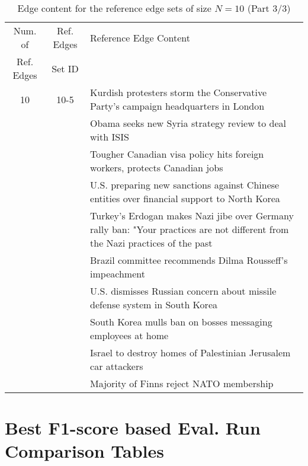 \begin{table}[H]
\begin{tabular}{cc p{10cm}}
\toprule
\multicolumn{1}{c}{Num. of}			& \multicolumn{1}{c}{Ref. Edges}		& \multicolumn{1}{l}{Reference Edge Content} \\
\multicolumn{1}{c}{Ref. Edges}		& \multicolumn{1}{c}{Set ID}			& \multicolumn{1}{c}{} \\
\midrule
10 & 10-5 & Kurdish protesters storm the Conservative Party's campaign headquarters in London \\
 &  & Obama seeks new Syria strategy review to deal with ISIS \\
 &  & Tougher Canadian visa policy hits foreign workers, protects Canadian jobs \\
 &  & U.S. preparing new sanctions against Chinese entities over financial support to North Korea \\
 &  & Turkey's Erdogan makes Nazi jibe over Germany rally ban: "Your practices are not different from the Nazi practices of the past \\
 &  & Brazil committee recommends Dilma Rousseff's impeachment \\
 &  & U.S. dismisses Russian concern about missile defense system in South Korea \\
 &  & South Korea mulls ban on bosses messaging employees at home \\
 &  & Israel to destroy homes of Palestinian Jerusalem car attackers \\
 &  & Majority of Finns reject NATO membership \\
\bottomrule
\end{tabular}
\caption{Edge content for the reference edge sets of size \(N = 10\) (Part 3/3)}
\label{tab:ref-edge-sets-nref-10-part-3}
\end{table}

\section{Best F1-score based Eval. Run Comparison Tables}
\label{app-sec:result-tables}

